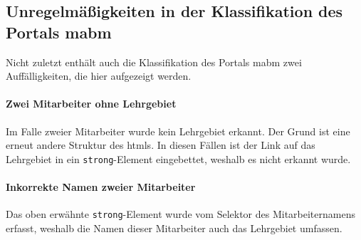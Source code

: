 \subsection{Unregelmäßigkeiten in der Klassifikation des Portals \acrshort{mabm}}
    Nicht zuletzt enthält auch die Klassifikation des Portals
    \gls{mabm}
    zwei Auffälligkeiten,
    die hier aufgezeigt werden.

    \paragraph{Zwei Mitarbeiter ohne Lehrgebiet}
    Im Falle zweier Mitarbeiter wurde kein Lehrgebiet erkannt.
    Der Grund ist eine erneut andere Struktur des \glspl{html}.
    In diesen Fällen ist der Link auf das Lehrgebiet
    in ein \texttt{strong}-Element eingebettet, weshalb es nicht erkannt wurde.

    \paragraph{Inkorrekte Namen zweier Mitarbeiter}
    Das oben erwähnte \texttt{strong}-Element wurde vom Selektor des Mitarbeiternamens erfasst,
    weshalb die Namen dieser Mitarbeiter auch das Lehrgebiet umfassen.
